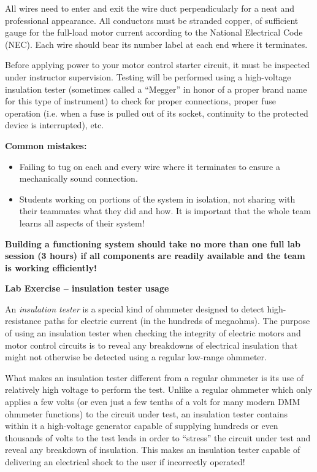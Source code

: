 All wires need to enter and exit the wire duct perpendicularly for a neat and professional appearance.  All conductors must be stranded copper, of sufficient gauge for the full-load motor current according to the National Electrical Code (NEC).  Each wire should bear its number label at each end where it terminates.

\vskip 10pt

Before applying power to your motor control starter circuit, it must be inspected under instructor supervision.  Testing will be performed using a high-voltage insulation tester (sometimes called a ``Megger'' in honor of a proper brand name for this type of instrument) to check for proper connections, proper fuse operation (i.e. when a fuse is pulled out of its socket, continuity to the protected device is interrupted), etc. 

\vskip 10pt

{\bf Common mistakes:}

\begin{itemize}
\item{} Failing to tug on each and every wire where it terminates to ensure a mechanically sound connection.
\item{} Students working on portions of the system in isolation, not sharing with their teammates what they did and how.  It is important that the whole team learns all aspects of their system!
\end{itemize}

\vskip 10pt

{\bf Building a functioning system should take no more than one full lab session (3 hours) if all components are readily available and the team is working efficiently!}








\vfil \eject

\noindent
{\bf Lab Exercise -- insulation tester usage}

\vskip 5pt

An {\it insulation tester} is a special kind of ohmmeter designed to detect high-resistance paths for electric current (in the hundreds of megaohms).  The purpose of using an insulation tester when checking the integrity of electric motors and motor control circuits is to reveal any breakdowns of electrical insulation that might not otherwise be detected using a regular low-range ohmmeter.

What makes an insulation tester different from a regular ohmmeter is its use of relatively high voltage to perform the test.  Unlike a regular ohmmeter which only applies a few volts (or even just a few tenths of a volt for many modern DMM ohmmeter functions) to the circuit under test, an insulation tester contains within it a high-voltage generator capable of supplying hundreds or even thousands of volts to the test leads in order to ``stress'' the circuit under test and reveal any breakdown of insulation.  This makes an insulation tester capable of delivering an electrical shock to the user if incorrectly operated!

